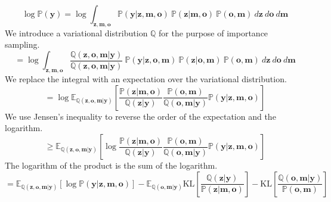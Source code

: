 \documentclass[a4paper,12pt,twoside,openright]{report}
\begin{document}
\begin{equation*}
    \log \mathbb{P}(\mathbf{y}) = \log \int_{\mathbf{z}, \mathbf{m}, \mathbf{o}} \mathbb{P}(\mathbf{y} | \mathbf{z}, \mathbf{m}, \mathbf{o}) ~ \mathbb{P}(\mathbf{z} | \mathbf{m}, \mathbf{o}) ~ \mathbb{P}(\mathbf{o} , \mathbf{m}) ~ d\mathbf{z} ~ d\mathbf{o} ~ d\mathbf{m}
\end{equation*}
We introduce a variational distribution $\mathbb{Q}$ for the purpose of importance sampling.
\begin{equation*} 
    = \log \int_{\mathbf{z}, \mathbf{m}, \mathbf{o}} \frac{\mathbb{Q}(\mathbf{z}, \mathbf{o}, \mathbf{m} | \mathbf{y})}{\mathbb{Q}(\mathbf{z}, \mathbf{o}, \mathbf{m} | \mathbf{y})} ~ \mathbb{P}(\mathbf{y} | \mathbf{z}, \mathbf{o}, \mathbf{m}) ~ \mathbb{P}(\mathbf{z} |\mathbf{o}, \mathbf{m}) ~ \mathbb{P}(\mathbf{o}, \mathbf{m}) ~ d\mathbf{z} ~ d\mathbf{o} ~ d\mathbf{m}
\end{equation*}
We replace the integral with an expectation over the variational distribution.
\begin{equation*}
    = \log \mathbb{E}_{\mathbb{Q}(\mathbf{z}, \mathbf{o}, \mathbf{m} | \mathbf{y})} \left[ \frac{\mathbb{P}(\mathbf{z} | \mathbf{m}, \mathbf{o})}{\mathbb{Q}(\mathbf{z} | \mathbf{y})} \frac{\mathbb{P}(\mathbf{o} , \mathbf{m})}{\mathbb{Q}(\mathbf{o}, \mathbf{m} | \mathbf{y})} \mathbb{P}(\mathbf{y} | \mathbf{z}, \mathbf{m}, \mathbf{o}) \right]
\end{equation*}
We use Jensen's inequality to reverse the order of the expectation and the logarithm.
\begin{equation*}
    \geq \mathbb{E}_{\mathbb{Q}(\mathbf{z}, \mathbf{o}, \mathbf{m} | \mathbf{y})} \left[ \log \frac{\mathbb{P}(\mathbf{z} | \mathbf{m}, \mathbf{o})}{\mathbb{Q}(\mathbf{z} | \mathbf{y})} \frac{\mathbb{P}(\mathbf{o} , \mathbf{m})}{\mathbb{Q}(\mathbf{o}, \mathbf{m} | \mathbf{y})} \mathbb{P}(\mathbf{y} | \mathbf{z}, \mathbf{m}, \mathbf{o}) \right]
\end{equation*}
The logarithm of the product is the sum of the logarithm.
\begin{equation*}
    = \mathbb{E}_{\mathbb{Q}(\mathbf{z}, \mathbf{o}, \mathbf{m} | \mathbf{y})} \left[ \log \mathbb{P}(\mathbf{y} | \mathbf{z}, \mathbf{m}, \mathbf{o}) \right] - \mathbb{E}_{\mathbb{Q}(\mathbf{o}, \mathbf{m} | \mathbf{y})} \mathrm{KL} \left[ \frac{\mathbb{Q}(\mathbf{z} | \mathbf{y})}{\mathbb{P}(\mathbf{z} | \mathbf{m}, \mathbf{o})} \right] - \mathrm{KL} \left[ \frac{\mathbb{Q}(\mathbf{o}, \mathbf{m}| \mathbf{y})}{\mathbb{P}(\mathbf{o} , \mathbf{m})} \right]
\end{equation*}
\end{document}
